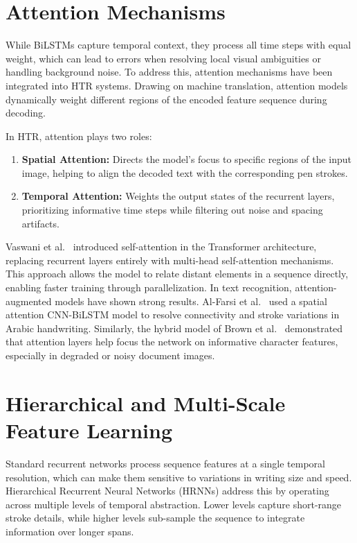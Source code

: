 \section{Attention Mechanisms}
While BiLSTMs capture temporal context, they process all time steps with equal weight, which can lead to errors when resolving local visual ambiguities or handling background noise. To address this, attention mechanisms have been integrated into HTR systems. Drawing on machine translation, attention models dynamically weight different regions of the encoded feature sequence during decoding.

In HTR, attention plays two roles:
\begin{enumerate}
    \item \textbf{Spatial Attention:} Directs the model's focus to specific regions of the input image, helping to align the decoded text with the corresponding pen strokes.
    \item \textbf{Temporal Attention:} Weights the output states of the recurrent layers, prioritizing informative time steps while filtering out noise and spacing artifacts.
\end{enumerate}

Vaswani et al.~\cite{vaswani2017attention} introduced self-attention in the Transformer architecture, replacing recurrent layers entirely with multi-head self-attention mechanisms. This approach allows the model to relate distant elements in a sequence directly, enabling faster training through parallelization. In text recognition, attention-augmented models have shown strong results. Al-Farsi et al.~\cite{study2025arabic} used a spatial attention CNN-BiLSTM model to resolve connectivity and stroke variations in Arabic handwriting. Similarly, the hybrid model of Brown et al.~\cite{study2023hybrid} demonstrated that attention layers help focus the network on informative character features, especially in degraded or noisy document images.

\section{Hierarchical and Multi-Scale Feature Learning}
Standard recurrent networks process sequence features at a single temporal resolution, which can make them sensitive to variations in writing size and speed. Hierarchical Recurrent Neural Networks (HRNNs) address this by operating across multiple levels of temporal abstraction. Lower levels capture short-range stroke details, while higher levels sub-sample the sequence to integrate information over longer spans.

